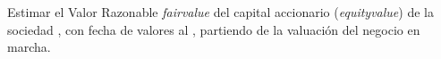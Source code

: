 Estimar el Valor Razonable \textit{\gls{fairvalue}}   del capital accionario (\textit{\gls{equityvalue}}) de la sociedad \textcolor{principal}{\bienesValuados}, con fecha de valores al \textcolor{principal}{\fechaValores}, partiendo de la valuaci\'on del negocio en marcha.